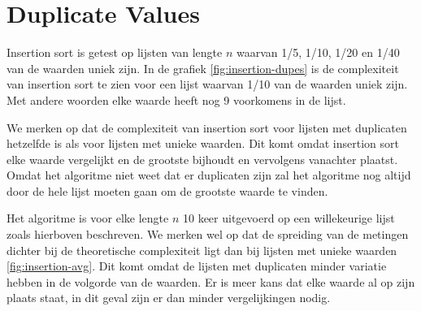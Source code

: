 \documentclass[a4paper]{article}
\begin{document}
\section{Duplicate Values}
Insertion sort is getest op lijsten van lengte $n$ waarvan 1/5, 1/10, 1/20 en 1/40 van de waarden uniek zijn. 
In de grafiek \ref{fig:insertion-dupes} is de complexiteit van insertion sort te zien voor een lijst waarvan 1/10 van de waarden uniek zijn.
Met andere woorden elke waarde heeft nog 9 voorkomens in de lijst.
\par 
We merken op dat de complexiteit van insertion sort voor lijsten met duplicaten hetzelfde is als voor lijsten met unieke waarden.
Dit komt omdat insertion sort elke waarde vergelijkt en de grootste bijhoudt en vervolgens vanachter plaatst.
Omdat het algoritme niet weet dat er duplicaten zijn zal het algoritme nog altijd door de hele lijst moeten gaan om de grootste waarde te vinden.
\par
Het algoritme is voor elke lengte $n$ 10 keer uitgevoerd op een willekeurige lijst zoals hierboven beschreven.
We merken wel op dat de spreiding van de metingen dichter bij de theoretische complexiteit ligt dan bij lijsten met unieke waarden \ref{fig:insertion-avg}.
Dit komt omdat de lijsten met duplicaten minder variatie hebben in de volgorde van de waarden.
Er is meer kans dat elke waarde al op zijn plaats staat, in dit geval zijn er dan minder vergelijkingen nodig.
\end{document}
